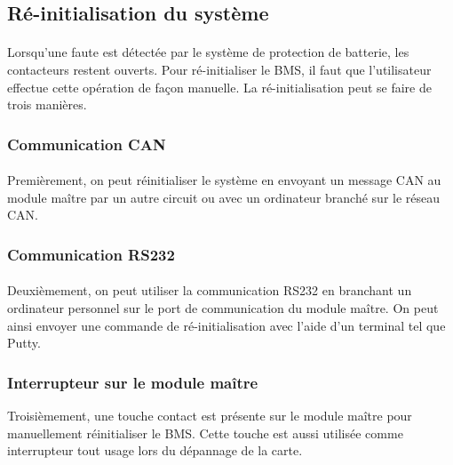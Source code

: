 \subsection{Ré-initialisation du système}

	\paragraph*{}
	Lorsqu'une faute est détectée par le système de protection de batterie, les contacteurs restent ouverts. Pour ré-initialiser le BMS, il faut que l'utilisateur effectue cette opération de façon manuelle. La ré-initialisation peut se faire de trois manières.
		
	\subsubsection{Communication CAN}
		\paragraph*{}
		Premièrement, on peut réinitialiser le système en envoyant un message CAN au module maître par un autre circuit ou avec un ordinateur branché sur le réseau CAN. 

	\subsubsection{Communication RS232}
		\paragraph*{}	
		Deuxièmement, on peut utiliser la communication RS232 en branchant un ordinateur personnel sur le port de communication du module maître. On peut ainsi envoyer une commande de ré-initialisation avec l'aide d'un terminal tel que Putty.
				
	\subsubsection{Interrupteur sur le module maître}
		Troisièmement, une touche contact est présente sur le module maître pour manuellement réinitialiser le BMS. Cette touche est aussi utilisée comme interrupteur tout usage lors du dépannage de la carte.